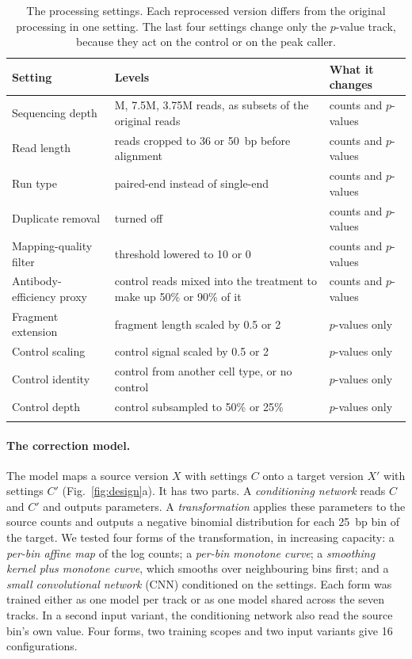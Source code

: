 \documentclass[pdflatex,sn-mathphys-num]{sn-jnl}
\newcommand{\lit}[1]{#1}
\newcommand{\nGenCfg}{16}
\begin{document}
\begin{table}[t]
\caption{The processing settings. Each reprocessed version differs from the original
processing in one setting. The last four settings change only the $p$-value track, because
they act on the control or on the peak caller.}
\label{tab:settings}
\footnotesize
\begin{tabular}{@{}>{\raggedright\arraybackslash}p{}>{\raggedright\arraybackslash}p{}>{\raggedright\arraybackslash}p{}@{}}
\toprule
Setting & Levels & What it changes \\
\midrule
Sequencing depth & \lit{15}M, \lit{7.5}M, \lit{3.75}M reads, as subsets of the original reads & counts and $p$-values \\
Read length & reads cropped to \lit{36} or \lit{50}~bp before alignment & counts and $p$-values \\
Run type & paired-end instead of single-end & counts and $p$-values \\
Duplicate removal & turned off & counts and $p$-values \\
Mapping-quality filter & threshold lowered to \lit{10} or \lit{0} & counts and $p$-values \\
Antibody-efficiency proxy & control reads mixed into the treatment to make up \lit{50}\% or \lit{90}\% of it & counts and $p$-values \\
Fragment extension & fragment length scaled by \lit{0.5} or \lit{2} & $p$-values only \\
Control scaling & control signal scaled by \lit{0.5} or \lit{2} & $p$-values only \\
Control identity & control from another cell type, or no control & $p$-values only \\
Control depth & control subsampled to \lit{50}\% or \lit{25}\% & $p$-values only \\
\botrule
\end{tabular}
\end{table}

\paragraph{The correction model.} The model maps a source version $X$ with settings $C$ onto a
target version $X'$ with settings $C'$ (Fig.~\ref{fig:design}a). It has two parts. A
\emph{conditioning network} reads $C$ and $C'$ and outputs parameters. A \emph{transformation}
applies these parameters to the source counts and outputs a negative binomial distribution
for each \lit{25}~bp bin of the target. We tested four forms of the transformation, in
increasing capacity: a \emph{per-bin affine map} of the log counts; a \emph{per-bin monotone
curve}; a \emph{smoothing kernel plus monotone curve}, which smooths over neighbouring bins
first; and a \emph{small convolutional network} (CNN) conditioned on the settings. Each form
was trained either as one model per track or as one model shared across the seven tracks. In
a second input variant, the conditioning network also read the source bin's own value. Four
forms, two training scopes and two input variants give \nGenCfg{} configurations.
\end{document}
